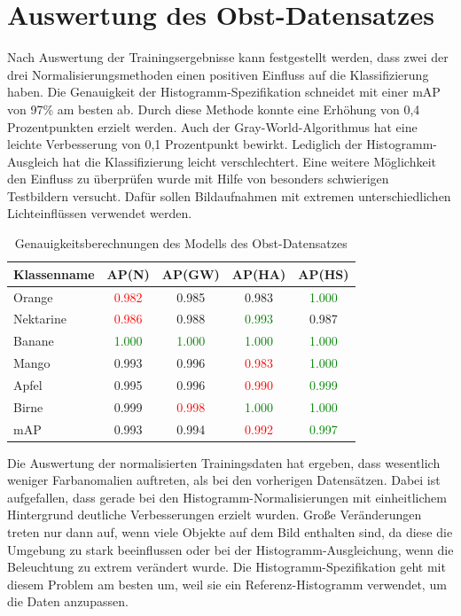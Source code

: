 \section{Auswertung des Obst-Datensatzes}
Nach Auswertung der Trainingsergebnisse kann festgestellt werden, dass zwei der drei Normalisierungsmethoden einen positiven Einfluss auf die Klassifizierung haben. 
Die Genauigkeit der Histogramm-Spezifikation schneidet mit einer mAP von 97\% am besten ab. Durch diese Methode konnte eine Erhöhung von 0,4 Prozentpunkten erzielt werden. Auch der Gray-World-Algorithmus hat eine leichte Verbesserung von 0,1 Prozentpunkt bewirkt. Lediglich der Histogramm-Ausgleich hat die Klassifizierung leicht verschlechtert. Eine weitere Möglichkeit den Einfluss zu überprüfen wurde mit Hilfe von besonders schwierigen Testbildern versucht. Dafür sollen Bildaufnahmen mit extremen unterschiedlichen Lichteinflüssen verwendet werden.
\begin{table}
[h]
\caption{Genauigkeitsberechnungen des Modells des Obst-Datensatzes}
\centering
\begin{tabular}{|l|c|c|c|c|}
\hline
Klassenname & AP(N) & AP(GW) & AP(HA) & AP(HS)\\
\hline
Orange & \textcolor{red}{0.982} & 0.985 & 0.983 & \textcolor{green}{1.000}\\
Nektarine & \textcolor{red}{0.986} & 0.988 & \textcolor{green}{0.993} & 0.987\\
Banane & \textcolor{green}{1.000} & \textcolor{green}{1.000} & \textcolor{green}{1.000} & \textcolor{green}{1.000}\\
Mango & 0.993 & 0.996 & \textcolor{red}{0.983} & \textcolor{green}{1.000}\\
Apfel & 0.995 & 0.996 & \textcolor{red}{0.990} & \textcolor{green}{0.999}\\
Birne & 0.999 & \textcolor{red}{0.998} & \textcolor{green}{1.000} & \textcolor{green}{1.000}\\
\hline
mAP & 0.993 & 0.994 & \textcolor{red}{0.992} & \textcolor{green}{0.997}\\
\hline
\end{tabular}
\end{table}
Die Auswertung der normalisierten Trainingsdaten hat ergeben, dass wesentlich weniger Farbanomalien auftreten, als bei den vorherigen Datensätzen. Dabei ist aufgefallen, dass gerade bei den Histogramm-Normalisierungen mit einheitlichem Hintergrund deutliche Verbesserungen erzielt wurden. Große Veränderungen treten nur dann auf, wenn viele Objekte auf dem Bild enthalten sind, da diese die Umgebung zu stark beeinflussen oder bei der Histogramm-Ausgleichung, wenn die Beleuchtung zu extrem verändert wurde. Die Histogramm-Spezifikation geht mit diesem Problem am besten um, weil sie ein Referenz-Histogramm verwendet, um die Daten anzupassen. \\\\
